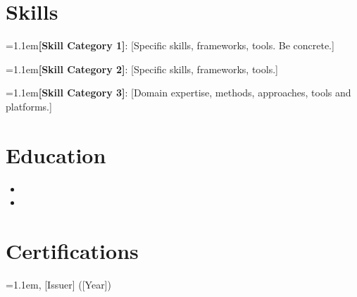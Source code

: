\documentclass[11pt,a4paper,sans]{moderncv}
\begin{document}
\section{Skills}
\vspace{1pt}
\par\noindent\hangindent=1.1em\relax \textbf{[Skill Category 1]}: [Specific skills, frameworks, tools. Be concrete.]\par\vspace{1.5pt}
\par\noindent\hangindent=1.1em\relax \textbf{[Skill Category 2]}: [Specific skills, frameworks, tools.]\par\vspace{1.5pt}
\par\noindent\hangindent=1.1em\relax \textbf{[Skill Category 3]}: [Domain expertise, methods, approaches, tools and platforms.]\par


\section{Education}
\vspace{1pt}
\begin{itemize}

\item{}

\vspace{3pt}

\item{}

\end{itemize}


\section{Certifications}
\vspace{1pt}
\par\noindent\hangindent=1.1em, [Issuer] ([Year])\par
\end{document}

